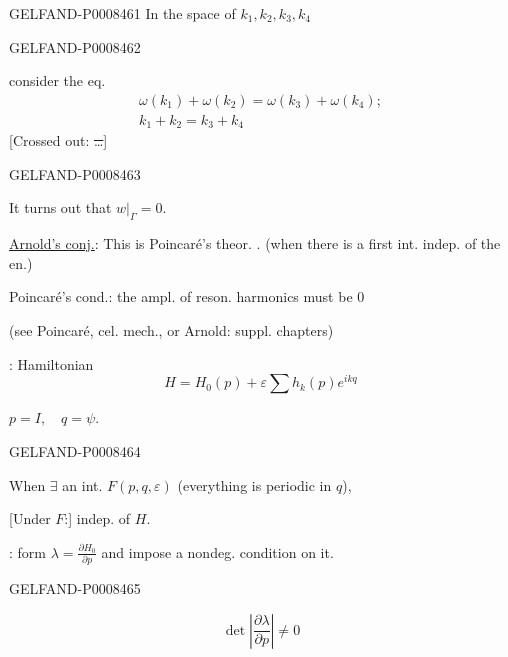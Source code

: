 \begin{GelfandAdjacentEvidence}{GELFAND-P000846}{1}
In the space of \(k_1,k_2,k_3,k_4\)
\end{GelfandAdjacentEvidence}
\begin{GelfandAdjacentEvidence}{GELFAND-P000846}{2}


consider the eq.
\[
\begin{gathered}
\omega(k_1)+\omega(k_2)=\omega(k_3)+\omega(k_4);\\
k_1+k_2=k_3+k_4
\end{gathered}
\]
[Crossed out: \sout{…}]
\end{GelfandAdjacentEvidence}
\begin{GelfandAdjacentEvidence}{GELFAND-P000846}{3}


It turns out that \(w|_\Gamma=0\).

\uline{Arnold’s conj.}: This is Poincaré’s theor. . (when there is a first int. indep. of the en.)

Poincaré’s cond.: the ampl. of reson. harmonics must be \(0\)

(see Poincaré, cel. mech., or Arnold: suppl. chapters)

: Hamiltonian
\[
H=H_0(p)+\varepsilon\sum h_k(p)e^{ikq}
\]

\(p=I,\quad q=\psi\).
\end{GelfandAdjacentEvidence}
\begin{GelfandAdjacentEvidence}{GELFAND-P000846}{4}


When \(\exists\) an int. \(F(p,q,\varepsilon)\) (everything is periodic in \(q\)),

[Under \(F\):] indep. of \(H\).

: form \(\lambda=\frac{\partial H_0}{\partial p}\) and impose a nondeg. condition on it.
\end{GelfandAdjacentEvidence}
\begin{GelfandAdjacentEvidence}{GELFAND-P000846}{5}


\[
\det\left|\frac{\partial\lambda}{\partial p}\right|\ne0
\]
\end{GelfandAdjacentEvidence}
